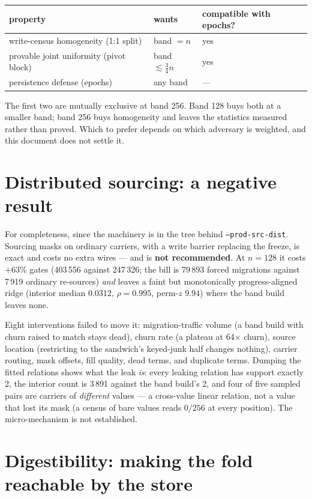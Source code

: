 \documentclass[11pt]{article}
\newcommand{\code}[1]{\texttt{#1}}
\begin{document}
\begin{center}
\begin{tabular}{lll}
\toprule
property & wants & compatible with epochs? \\
\midrule
write-census homogeneity (1:1 split) & band $= n$ & yes \\
provable joint uniformity (pivot block) & band $\lesssim \tfrac34 n$ & yes \\
persistence defense (epochs) & any band & --- \\
\bottomrule
\end{tabular}
\end{center}

The first two are mutually exclusive at band 256. Band 128 buys both at a
smaller band; band 256 buys homogeneity and leaves the statistics measured
rather than proved. Which to prefer depends on which adversary is weighted,
and this document does not settle it.

\section{Distributed sourcing: a negative result}
\label{sec:dist}

For completeness, since the machinery is in the tree behind
\code{--prod-src-dist}. Sourcing masks on ordinary carriers, with a write
barrier replacing the freeze, is exact and costs no extra wires --- and is
\textbf{not recommended}. At $n{=}128$ it costs $+63\%$ gates (403\,556 against
247\,326; the bill is 79\,893 forced migrations against 7\,919 ordinary
re-sources) \emph{and} leaves a faint but monotonically progress-aligned ridge
(interior median $0.0312$, $\rho = 0.995$, perm-$z$ $9.94$) where the band build
leaves none.

Eight interventions failed to move it: migration-traffic volume (a band build
with churn raised to match stays dead), churn rate (a plateau at 64$\times$
churn), source location (restricting to the sandwich's keyed-junk half changes
nothing), carrier routing, mask offsets, fill quality, dead terms, and
duplicate terms. Dumping the fitted relations shows what the leak \emph{is}:
every leaking relation has support exactly 2, the interior count is 3\,891
against the band build's 2, and four of five sampled pairs are carriers of
\emph{different} values --- a cross-value linear relation, not a value that lost
its mask (a census of bare values reads $0/256$ at every position). The
micro-mechanism is not established.

\section{Digestibility: making the fold reachable by the store}
\label{sec:digest}
\end{document}
